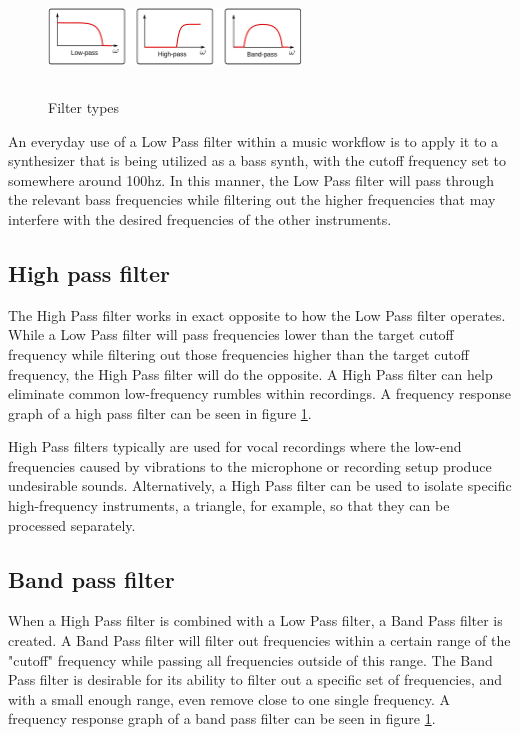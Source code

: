 \documentclass[a4paper,12pt]{report}
\begin{document}
\begin{figure}[h]
    \centering
    \includegraphics[width=0.6\textwidth,height=3cm]{FilterTypes.jpg}
    \caption{Filter types}
    \label{fig:FilterTypes}
\end{figure}

An everyday use of a Low Pass filter within a music workflow is to apply it to a synthesizer that is being utilized as a bass synth, with the cutoff frequency set to somewhere around 100hz. In this manner, the Low Pass filter will pass through the relevant bass frequencies while filtering out the higher frequencies that may interfere with the desired frequencies of the other instruments.

\subsection{High pass filter}
\label{subsec:highpassfilter}
The High Pass filter works in exact opposite to how the Low Pass filter operates. While a Low Pass filter will pass frequencies lower than the target cutoff frequency while filtering out those frequencies higher than the target cutoff frequency, the High Pass filter will do the opposite. A High Pass filter can help eliminate common low-frequency rumbles within recordings. A frequency response graph of a high pass filter can be seen in figure \ref{fig:FilterTypes}.

High Pass filters typically are used for vocal recordings where the low-end frequencies caused by vibrations to the microphone or recording setup produce undesirable sounds. Alternatively, a High Pass filter can be used to isolate specific high-frequency instruments, a triangle, for example, so that they can be processed separately.

\subsection{Band pass filter}
\label{subsec:bandpassfilter}
When a High Pass filter is combined with a Low Pass filter, a Band Pass filter is created. A Band Pass filter will filter out frequencies within a certain range of the "cutoff" frequency while passing all frequencies outside of this range. The Band Pass filter is desirable for its ability to filter out a specific set of frequencies, and with a small enough range, even remove close to one single frequency. A frequency response graph of a band pass filter can be seen in figure \ref{fig:FilterTypes}.
\end{document}
